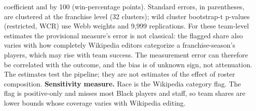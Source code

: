 \begin{table}[!h]
{\begin{threeparttable}
\begin{tablenotes}[para]
coefficient and by 100 (win-percentage points). Standard errors, in parentheses, are clustered at the franchise level (32 clusters); wild cluster bootstrap-t p-values (restricted, WCR) use Webb weights and 9,999 replications. For these team-level estimates the provisional measure's error is not classical: the flagged share also varies with how completely Wikipedia editors categorize a franchise-season's players, which may rise with team success. The measurement error can therefore be correlated with the outcome, and the bias is of unknown sign, not attenuation. The estimates test the pipeline; they are not estimates of the effect of roster composition. \textbf{Sensitivity measure.} Race is the Wikipedia category flag. The flag is positive-only and misses most Black players and staff, so team shares are lower bounds whose coverage varies with Wikipedia editing.
\end{tablenotes}
\end{threeparttable}}
\end{table}
